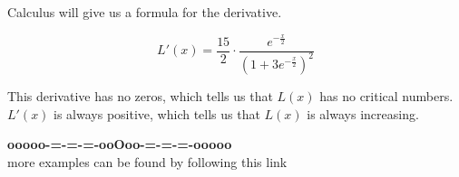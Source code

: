 \documentclass{ximera}
\begin{document}
Calculus will give us a formula for the derivative.

\[  L'(x) =   \frac{15}{2} \cdot \frac{e^{-\tfrac{x}{2}}}{\left(1+3 e^{-\tfrac{x}{2}}\right)^2}    \]


This derivative has no zeros, which tells us that $L(x)$ has no critical numbers.  $L'(x)$ is always positive, which tells us that $L(x)$ is always increasing.








\begin{onlineOnly}
\begin{center}
\textbf{\textcolor{green!50!black}{ooooo-=-=-=-ooOoo-=-=-=-ooooo}} \\

more examples can be found by following this link\\ 

\end{center}
\end{onlineOnly}
\end{document}
